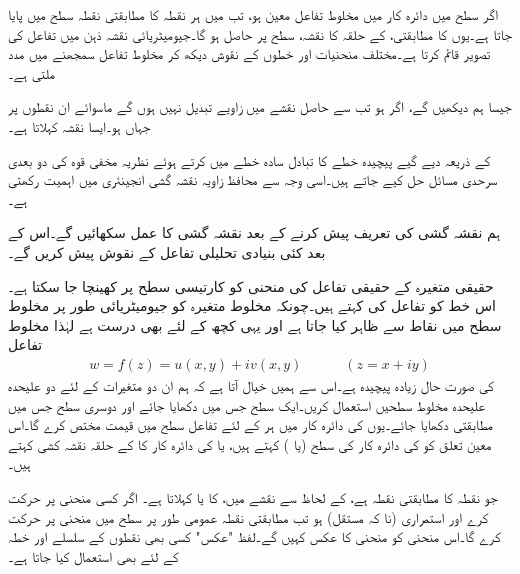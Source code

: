 اگر  سطح میں دائرہ کار  میں مخلوط تفاعل  معین ہو، تب  میں ہر نقطہ کا مطابقتی نقطہ  سطح میں پایا جاتا ہے۔یوں 
 کا مطابقتی،  کے حلقہ کا نقشہ،  سطح پر حاصل ہو گا۔جیومیٹریائی نقشہ ذہن میں تفاعل کی تصویر قائم کرتا ہے۔مختلف منحنیات اور خطوں کے نقوش دیکھ کر مخلوط تفاعل سمجھنے میں مدد ملتی ہے۔

جیسا ہم دیکھیں گے، اگر   ہو تب  سے حاصل نقشے میں زاویے تبدیل نہیں ہوں گے ماسوائے ان نقطوں پر جہاں  ہو۔ایسا نقشہ  کہلاتا ہے۔ 

 کے ذریعہ دیے گیے پیچیدہ خطے کا تبادل سادہ خطے میں کرتے ہوئے نظریہ مخفی قوہ کی دو بعدی سرحدی مسائل حل کیے جاتے ہیں۔اسی وجہ سے محافظ زاویہ نقشہ گشی انجینئری میں اہمیت رکھتی ہے۔

ہم نقشہ گشی کی تعریف پیش کرنے کے بعد نقشہ گشی کا عمل سکھائیں گے۔اس کے بعد کئی بنیادی تحلیلی تفاعل  کے نقوش پیش کریں گے۔

حقیقی متغیرہ  کے حقیقی تفاعل  کی منحنی  کو کارتیسی  سطح پر  کھینچا جا سکتا ہے۔اس خط کو تفاعل کی  کہتے ہیں۔چونکہ مخلوط متغیرہ  کو جیومیٹریائی طور پر مخلوط سطح میں نقاط سے ظاہر کیا جاتا ہے اور یہی کچھ   کے لئے بھی درست ہے لہٰذا مخلوط تفاعل
\begin{align}
w=f(z)=u(x,y)+iv(x,y)\quad \quad \quad (z=x+iy)
\end{align}
کی صورت حال زیادہ پیچیدہ ہے۔اس سے ہمیں خیال آتا ہے کہ ہم ان دو متغیرات کے لئے دو علیحدہ علیحدہ مخلوط سطحیں استعمال کریں۔ایک  سطح جس میں  دکھایا جائے اور دوسری  سطح جس میں مطابقتی  دکھایا جائے۔یوں   کی دائرہ کار  میں ہر   کے لئے تفاعل   سطح    میں قیمت   مختص کرے گا۔اس معین تعلق کو  کی دائرہ کار کی سطح     (یا ) کہتے ہیں، یا  کی دائرہ کار کا  کے حلقہ  نقشہ کشی کہتے ہیں۔

 جو نقطہ  کا مطابقتی نقطہ ہے،   کے لحاظ سے نقشے میں،  کا   یا  کہلاتا ہے۔ اگر  کسی منحنی پر حرکت کرے اور  استمراری (نا کہ مستقل)  ہو تب مطابقتی نقطہ  عمومی طور پر سطح  میں منحنی  پر حرکت کرے گا۔اس منحنی کو منحنی  کا عکس کہیں گے۔لفظ "عکس" کسی بھی نقطوں کے سلسلے اور خطہ کے لئے بھی استعمال کیا جاتا ہے۔ 


